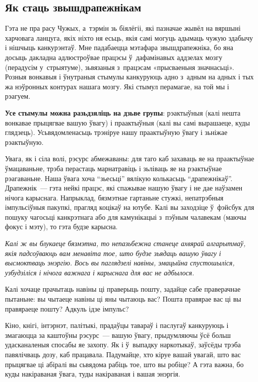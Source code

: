 
\subsection*{Як стаць звышдрапежнікам}

Гэта не пра расу Чужых, а~тэрмін зь біялёгіі, які пазначае жывёл на вяршыні харчовага ланцуга, якіх ніхто ня есьць, якія самі могуць адымаць чужую здабычу і нішчыць канкурэнтаў. Мне падабаецца мэтафара звышдрапежніка, бо яна досыць дакладна адлюстроўвае працэсы ў~дафамінавых аддзелах мозгу (перадусім у~стрыятуме), зьвязаныя з~працэсам «прысваеньня значнасьці». Розныя вонкавыя і ўнутраныя стымулы канкуруюць адно з~адным на адных і тых жа нэўронных контурах нашага мозгу. Які стымул перамагае, на той мы і рэагуем.

\textbf{Усе стымулы можна разьдзяліць на дзьве групы}: рэактыўныя (калі нешта вонкавае прыцягвае вашую ўвагу) і праактыўныя (калі вы самі вырашаеце, куды глядзець). Усьвядомленасьць трэніруе нашу праактыўную ўвагу і зьніжае рэактыўную.

Увага, як і сіла волі, рэсурс абмежаваны: для таго каб захаваць яе на праактыўнае ўмацаваньне, трэба перастаць марнатравіць і зьліваць яе на рэактыўнае рэагаваньне. Наша ўвага хоча ``зьесьці'' вялікую колькасьць ``драпежнікаў''. Драпежнік~--- гэта нейкі працэс, які спажывае нашую ўвагу і не дае наўзамен нічога карыснага. Напрыклад, бязмэтнае гартаньне стужкі, непатрэбныя імпульсіўныя пакупкі, прагляд коцікаў на ютубе. Калі вы заходзіце ў~фэйсбук для пошуку чагосьці канкрэтнага або для камунікацыі з~пэўным чалавекам (маючы фокус і мэту), то гэта будзе карысна.

\emph{Калі ж вы блукаеце бязмэтна, то непазьбежна станеце ахвярай алгарытмаў, якія падсоўваюць вам менавіта тое, што будзе зьядаць вашую ўвагу і высмоктваць энэргію. Вось вы паглядзелі навіны, эмацыйна спустошыліся, узбудзіліся і нічога важнага і карыснага для вас не адбылося.}

Калі хочаце прачытаць навіны ці праверыць пошту, задайце сабе праверачнае пытаньне: вы чытаеце навіны ці яны чытаюць вас? Пошта правярае вас ці вы правяраеце пошту? Адкуль ідзе імпульс?

Кіно, кнігі, інтэрнэт, палітыкі, прадаўцы тавараў і паслугаў канкуруюць і змагаюцца за каштоўны рэсурс~--- вашую ўвагу, прыдумляючы ўсё больш удасканаленыя спосабы яе захопу. Як і ў~выпадку наркотыкаў, заўсёды трэба павялічваць дозу, каб працавала. Падумайце, хто кіруе вашай увагай, што вас прыцягвае ці абіралі вы сьвядома рабіць тое, што вы робіце? А гэта важна, бо куды накіраваная ўвага, туды накіраваная і вашая энэргія.

